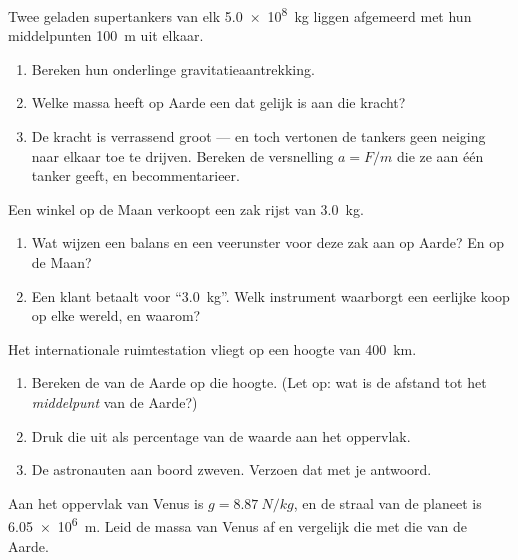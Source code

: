 \begin{exercise}[$\star\star$]\label{exo:g10:universal-gravitation:6}
Twee geladen supertankers van elk \qty{5.0e8}{kg} liggen afgemeerd met
hun middelpunten \qty{100}{m} uit elkaar.
\begin{enumerate}
  \item Bereken hun onderlinge gravitatieaantrekking.
  \item Welke massa heeft op Aarde een  dat gelijk is aan die
        kracht?
  \item De kracht is verrassend groot --- en toch vertonen de tankers
        geen neiging naar elkaar toe te drijven. Bereken de versnelling
        $a = F/m$ die ze aan één tanker geeft, en becommentarieer.
\end{enumerate}
\end{exercise}

\begin{exercise}[$\star\star$]\label{exo:g10:universal-gravitation:7}
Een winkel op de Maan verkoopt een zak rijst van \qty{3.0}{kg}.
\begin{enumerate}
  \item Wat wijzen een balans en een veerunster voor deze zak aan op
        Aarde? En op de Maan?
  \item Een klant betaalt voor ``\qty{3.0}{kg}''. Welk instrument
        waarborgt een eerlijke koop op elke wereld, en waarom?
\end{enumerate}
\end{exercise}

\begin{exercise}[$\star\star$]\label{exo:g10:universal-gravitation:8}
Het internationale ruimtestation vliegt op een hoogte van \qty{400}{km}.
\begin{enumerate}
  \item Bereken de  van de Aarde op die hoogte.
        (Let op: wat is de afstand tot het \emph{middelpunt} van de
        Aarde?)
  \item Druk die uit als percentage van de waarde aan het oppervlak.
  \item De astronauten aan boord zweven. Verzoen dat met je antwoord.
\end{enumerate}
\end{exercise}

\begin{exercise}[$\star\star$]\label{exo:g10:universal-gravitation:9}
Aan het oppervlak van Venus is $g = \qty{8.87}{N/kg}$, en de straal van
de planeet is \qty{6.05e6}{m}. Leid de massa van Venus af en vergelijk
die met die van de Aarde.
\end{exercise}

